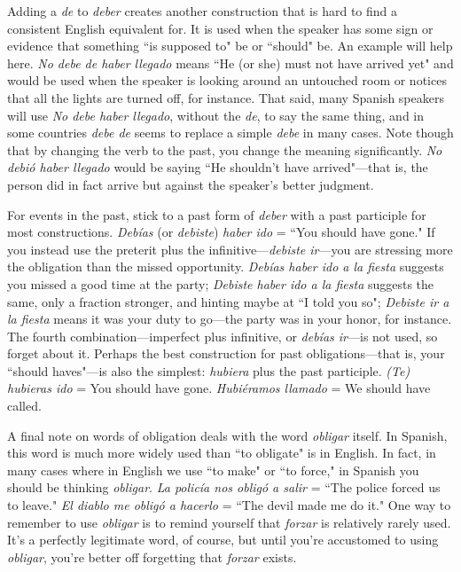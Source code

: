 Adding a \emph{de} to \emph{deber} creates another construction that is
hard to find a consistent English equivalent for. It is used when the
speaker has some sign or evidence that something ``is supposed to"
be or ``should" be. An example will help here. \emph{No debe de haber llegado} means ``He (or she) must not have arrived yet" and would be used
when the speaker is looking around an untouched room or notices that
all the lights are turned off, for instance. That said, many Spanish speakers will use \emph{No debe haber llegado}, without the \emph{de}, to say the
same thing, and in some countries \emph{debe de} seems to replace a simple
\emph{debe} in many cases. Note though that by changing the verb to the
past, you change the meaning significantly. \emph{No debió haber llegado}
would be saying ``He shouldn't have arrived"---that is, the person did
in fact arrive but against the speaker's better judgment.

For events in the past, stick to a past form of \emph{deber} with a past
participle for most constructions. \emph{Debías} (or \emph{debiste}) \emph{haber ido} =
``You should have gone." If you instead use the preterit plus the infinitive---\emph{debiste ir}---you are stressing more the obligation than the
missed opportunity. \emph{Debías haber ido a la fiesta} suggests you missed a
good time at the party; \emph{Debiste haber ido a la fiesta} suggests the same,
only a fraction stronger, and hinting maybe at ``I told you so"; \emph{Debiste
ir a la fiesta} means it was your duty to go---the party was in your
honor, for instance. The fourth combination---imperfect plus infinitive, or \emph{debías ir}---is not used, so forget about it. Perhaps the best construction for past obligations---that is, your ``should haves"---is also
the simplest: \emph{hubiera} plus the past participle. \emph{(Te) hubieras ido} = You
should have gone. \emph{Hubiéramos llamado} = We should have called.

A final note on words of obligation deals with the word \emph{obligar} itself. In Spanish, this word is much more widely used than ``to
obligate" is in English. In fact, in many cases where in English we use
``to make" or ``to force," in Spanish you should be thinking \emph{obligar}. \emph{La
policía nos obligó a salir} = ``The police forced us to leave." \emph{El diablo
me obligó a hacerlo} = ``The devil made me do it." One way to remember to use \emph{obligar} is to remind yourself that \emph{forzar} is relatively rarely
used. It's a perfectly legitimate word, of course, but until you're accustomed to using \emph{obligar}, you're better off forgetting that \emph{forzar} exists.

